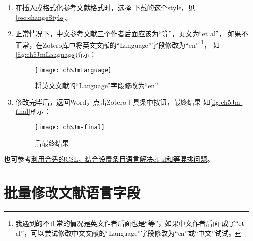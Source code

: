 \documentclass[theorem=false,mathfont=none,openany,sub3section]{easybook}
\begin{document}
{\begin{enumerate}
	\item 在插入或格式化参考文献格式时，选择
	下载的这个style，见\cref{sec:changeStyle}。
	 
	\item 正常情况下，中文参考文献三个作者后面应该为“等”，英文为“et al”，
	如果不正常，在Zotero库中将英文文献的“Language”字段修改为“en”
	\footnote{我遇到的不正常的情况是英文作者后面也是“等”，如果中文作者后面
		成了“et al”，可以尝试修改中文文献的“Language”字段修改为“cn”或“中文”试试。}，
	如\autoref{fig:ch5JmLanguage}所示：
	\begin{figure}[htbp]
		\centering
		\texttt{[image: ch5JmLanguage]}
		\caption{将英文文献的“Language”字段修改为“en”}
		\label{fig:ch5JmLanguage}
	\end{figure}
	\item 修改完毕后，返回Word，点击Zotero工具条中按钮，最终结果
	如\autoref{fig:ch5Jm-final}所示：
	\begin{figure}[htbp]
		\centering
		\texttt{[image: ch5Jm-final]}
		\caption{后最终结果}
		\label{fig:ch5Jm-final}
	\end{figure}
\end{enumerate}

也可参考\href{https://gitee.com/zotero-chinese/zotero-chinese/issues/I4YKIN}{利用合适的CSL，结合设置条目语言解决et al和等混排问题}。

\section{批量修改文献语言字段}\label{sec:change_lan}	

}
\end{document}
